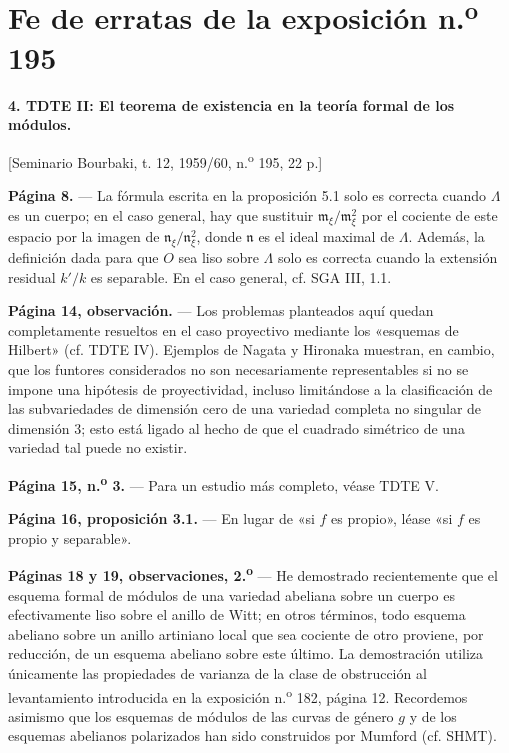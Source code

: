 \clearpage
\chapter*{Fe de erratas de la exposición n.\textsuperscript{o} 195}
\setcounter{footnote}{0}

\noindent\textbf{4. TDTE II: El teorema de existencia en la teoría formal de
los módulos.}

\begin{center}
[Seminario Bourbaki, t. 12, 1959/60, n.\textsuperscript{o} 195, 22 p.]
\end{center}

\noindent\textbf{Página 8.} --- La fórmula escrita en la proposición 5.1 solo es
correcta cuando $\Lambda$ es un cuerpo; en el caso general, hay que sustituir
$\mathfrak m_\xi/\mathfrak m_\xi^2$ por el cociente de este espacio por la
imagen de $\mathfrak n_\xi/\mathfrak n_\xi^2$, donde $\mathfrak n$ es el ideal
maximal de $\Lambda$. Además, la definición dada para que $O$ sea liso sobre
$\Lambda$ solo es correcta cuando la extensión residual $k'/k$ es separable.
En el caso general, cf. SGA III, 1.1.

\noindent\textbf{Página 14, observación.} --- Los problemas planteados aquí
quedan completamente resueltos en el caso proyectivo mediante los «esquemas de
Hilbert» (cf. TDTE IV). Ejemplos de Nagata y Hironaka muestran, en cambio, que
los funtores considerados no son necesariamente representables si no se impone
una hipótesis de proyectividad, incluso limitándose a la clasificación de las
subvariedades de dimensión cero de una variedad completa no singular de
dimensión 3; esto está ligado al hecho de que el cuadrado simétrico de una
variedad tal puede no existir.

\noindent\textbf{Página 15, n.\textsuperscript{o} 3.} --- Para un estudio más
completo, véase TDTE V.

\noindent\textbf{Página 16, proposición 3.1.} --- En lugar de «si $f$ es
propio», léase «si $f$ es propio y separable».

\noindent\textbf{Páginas 18 y 19, observaciones, 2.\textsuperscript{o}} --- He
demostrado recientemente que el esquema formal de módulos de una variedad
abeliana sobre un cuerpo es efectivamente liso sobre el anillo de Witt; en
otros términos, todo esquema abeliano sobre un anillo artiniano local que sea
cociente de otro proviene, por reducción, de un esquema abeliano sobre este
último. La demostración utiliza únicamente las propiedades de varianza de la
clase de obstrucción al levantamiento introducida en la exposición
n.\textsuperscript{o} 182, página 12. Recordemos asimismo que los esquemas de
módulos de las curvas de género $g$ y de los esquemas abelianos polarizados han
sido construidos por Mumford (cf. SHMT).

